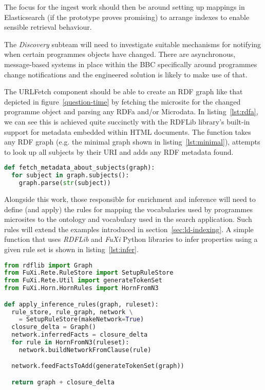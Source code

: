 The focus for the ingest work should then be around setting
up mappings in Elasticsearch (if the prototype proves promising)
to arrange indexes to enable sensible retrieval behaviour.

The \emph{Discovery} subteam will need to investigate
suitable mechanisms for notifying when certain programmes
objects have changed. There are asynchronous, message-based
systems in place within the BBC specifically around
programmes change notifications and the engineered solution
is likely to make use of that.

The URLFetch component should be able to create an RDF graph
like that depicted in figure~\ref{question-time} by
fetching the microsite for the changed programme object
and parsing any RDFa and/or Microdata. In listing~\ref{lst:rdfa},
we can see this is achieved quite succinctly with the
RDFLib library's built-in support for metadata embedded within
HTML documents. The function takes any RDF graph (e.g. the minimal
graph shown in listing~\ref{lst:minimal}), attempts to look up
all subjects by their URI and adds any RDF metadata found.

\begin{lstlisting}[language=Python,label=lst:rdfa,caption=Use of RDFLib to deference all subjects in upstream graph far and add any linked data found.]
def fetch_metadata_about_subjects(graph):
  for subject in graph.subjects():
    graph.parse(str(subject))
\end{lstlisting}

Alongside this work, those responsible for enrichment and
inference will need to define (and apply) the rules for
mapping the vocabularies used by programmes microsites
to the ontology and vocabulary used in the search application.
Such rules will extend the examples introduced in
section~\ref{sec:ld-indexing}. A simple function that
uses \emph{RDFLib} and \emph{FuXi} Python libraries to infer
properties using a given rule set is shown in listing~\ref{lst:infer}.

\begin{lstlisting}[language=Python,label=lst:infer,caption=Python code to expand an RDFLib Graph with inferred properties using FuXi.]
from rdflib import Graph
from FuXi.Rete.RuleStore import SetupRuleStore
from FuXi.Rete.Util import generateTokenSet
from FuXi.Horn.HornRules import HornFromN3

def apply_inference_rules(graph, ruleset):
  rule_store, rule_graph, network \
    = SetupRuleStore(makeNetwork=True)
  closure_delta = Graph()
  network.inferredFacts = closure_delta
  for rule in HornFromN3(ruleset):
    network.buildNetworkFromClause(rule)

  network.feedFactsToAdd(generateTokenSet(graph))

  return graph + closure_delta
\end{lstlisting}

